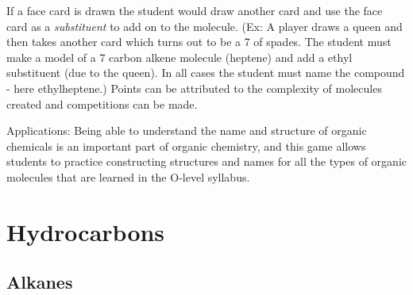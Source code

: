 \begin{multicols}{2}
\begin{description*}
{If a face card is drawn the student would draw another card and use the face card as a \emph{substituent} to add on to the molecule. (Ex: A player draws a queen and then takes another card which turns out to be a 7 of spades. The student must make a model of a 7 carbon alkene molecule (heptene) and add a ethyl substituent (due to the queen). In all cases the student must name the compound - here ethylheptene.) Points can be attributed to the complexity of molecules created and competitions can be made.}
\item[Applications:]{Being able to understand the name and structure of organic chemicals is an important part of organic chemistry, and this game allows students to practice constructing structures and names for all the types of organic molecules that are learned in the O-level syllabus.}
\end{description*}

\columnbreak


\section*{Hydrocarbons}


\subsection{Alkanes}



\end{multicols}

